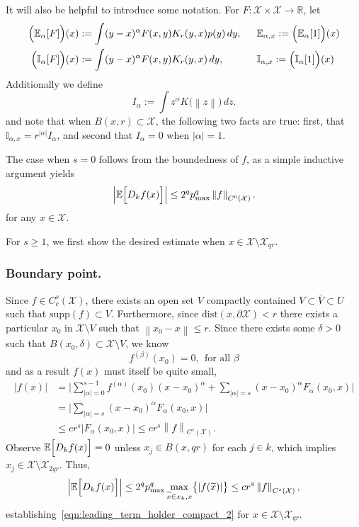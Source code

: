 \documentclass{article}
\newcommand{\Reals}{\mathbb{R}}
\newcommand{\abs}[1]{\left \lvert #1 \right \rvert}
\newcommand{\norm}[1]{\left \lVert #1 \right \rVert}
\newcommand{\1}{\mathbf{1}}
\newcommand{\Xset}{\mathcal{X}}
\newcommand{\Ebb}{\mathbb{E}}
\newcommand{\Ibb}{\mathbb{I}}
\newcommand{\wt}[1]{\widetilde{#1}}
\newcommand{\dist}{\mathrm{dist}}
\theoremstyle{alden}
\theoremstyle{aldenthm}
\theoremstyle{definition}
\theoremstyle{remark}
\begin{document}
It will also be helpful to introduce some notation. For $F: \Xset \times \Xset \to \Reals$, let
\begin{align*}
\Bigl(\Ebb_{\alpha}[F]\Bigr)(x) & := \int (y - x)^{\alpha} F(x,y) K_r(y,x) p(y) \,dy,~~ && \Ebb_{\alpha,x} := \Bigl(\Ebb_{\alpha}[1]\Bigr)(x) \\
\Bigl(\Ibb_{\alpha}[F]\Bigr)(x) & := \int (y - x)^{\alpha} F(x,y) K_r(y,x) \,dy,~~ && \Ibb_{\alpha,x}  := \Bigl(\Ibb_{\alpha}[1]\Bigr)(x)
\end{align*}
Additionally we define
\begin{equation*}
I_{\alpha} := \int z^{\alpha} K\bigl(\norm{z}\bigr) \,dz.
\end{equation*}
and note that when $B(x,r) \subset \Xset$, the following two facts are true: first, that $\Ibb_{\alpha,x} = r^{\abs{\alpha}} I_{\alpha}$, and second that $I_{\alpha} = 0$ when $\abs{\alpha} = 1$.

The case when $s = 0$ follows from the boundedness of $f$, as a simple inductive argument yields
\begin{equation*}
\abs{\Ebb\Bigl[D_kf(x)\Bigr]} \leq 2^qp_{\max}^q \norm{f}_{C^0(\Xset)}.
\end{equation*}
for any $x \in \Xset$.

For $s \geq 1$, we first show the desired estimate when $x \in \Xset \setminus \Xset_{qr}$. 

\subsubsection{Boundary point.}

Since $f \in C_c^{s}(\Xset)$, there exists an open set $V$ compactly contained $V \subset \bar{V} \subset U$ such that $\mathrm{supp}(f) \subset V$. Furthermore, since $\dist(x,\partial \Xset) < r$ there exists a particular $x_0$ in $\Xset \setminus V$ such that $\norm{x_0 - x} \leq r$. Since there exists some $\delta > 0$ such that $B(x_0,\delta) \subset \Xset \setminus V$, we know
\begin{equation*}
f^{(\beta)}(x_0) = 0,~~\textrm{for all $\beta$}
\end{equation*}
and as a result $f(x)$ must itself be quite small,
\begin{align*}
\bigl|f(x)\bigr| & = \biggl|\sum_{\abs{\alpha} = 0}^{s - 1} f^{(\alpha)}(x_0) (x - x_0)^{\alpha} + \sum_{\abs{\alpha} = s}(x - x_0)^{\alpha}F_{\alpha}(x_0,x)\biggr| \\
& = \biggl|\sum_{\abs{\alpha} = s}(x - x_0)^{\alpha}F_{\alpha}(x_0,x)\biggr| \\
& \leq c r^{s} \abs{F_{\alpha}(x_0,x)} \leq c r^{s} \norm{f}_{C^s(\Xset)}.
\end{align*}
Observe $\Ebb\Bigl[D_kf(x)\Bigr] = 0$ unless $x_j \in B(x,qr)$ for each $j \in k$, which implies $x_j \in \Xset \setminus \Xset_{2qr}$. Thus,
\begin{equation*}
\abs{\Ebb\Bigl[D_kf(x)\Bigr]} \leq 2^q p_{\max}^q \max_{\wt{x} \in x_k, x} \bigl\{\abs{f(\wt{x})}\bigr\}  \leq c r^s \norm{f}_{C^s(\Xset)},
\end{equation*}
establishing~\eqref{eqn:leading_term_holder_compact_2} for $x \in \Xset \setminus \Xset_{qr}$.
\end{document}
